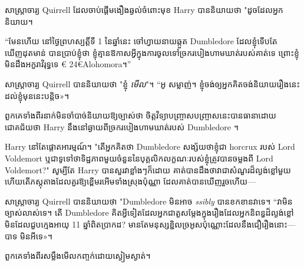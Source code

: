 សាស្ត្រាចារ្យ Quirrell ដែលចាប់ផ្តើមងឿងឆ្ងល់ចំពោះមុខ Harry បាននិយាយថា "ដូចដែលអ្នកនិយាយ។

“មែនហើយ នៅថ្ងៃព្រហស្បត្តិ៍ទី 1 នៃឆ្នាំនេះ ចៅហ្វាយនាយឆ្កួត Dumbledore ដែលខ្ញុំទើបតែឃើញដុតមាន់ បានប្រាប់ខ្ញុំថា ខ្ញុំគ្មានឱកាសអ្វីក្នុងការចូលទៅច្រករបៀងហាមឃាត់របស់គាត់ទេ ព្រោះខ្ញុំមិនដឹងអក្ខរាវិរុទ្ធទេ € 24€{Alohomora។}”

សាស្រ្តាចារ្យ Quirrell បាននិយាយថា "ខ្ញុំ \emph{មើល}"។ “អូ សម្លាញ់។ ខ្ញុំ​ចង់​ឲ្យ​អ្នក​គិត​ចង់​និយាយ​រឿង​នេះ​ដល់​ខ្ញុំ​មុន​នេះ​បន្តិច»។

ពួកគេទាំងពីរនាក់មិនចាំបាច់និយាយឱ្យច្បាស់ថា ចិត្តវិទ្យាបញ្ច្រាសបញ្ច្រាសនេះបានធានាដោយជោគជ័យថា Harry នឹងនៅឆ្ងាយពីច្រករបៀងហាមឃាត់របស់ Dumbledore ។

Harry នៅតែផ្តោតអារម្មណ៍។ "តើអ្នកគិតថា Dumbledore សង្ស័យថាខ្ញុំជា horcrux របស់ Lord Voldemort ឬជាទូទៅថាទិដ្ឋភាពមួយចំនួននៃបុគ្គលិកលក្ខណៈរបស់ខ្ញុំត្រូវបានចម្លងពី Lord Voldemort?" សូម្បីតែ Harry បានសួរវាខ្លាំងៗក៏ដោយ គាត់បានដឹងថាវាជាសំណួរដ៏ល្ងង់ខ្លៅមួយ ហើយតើភស្តុតាងដែលគួរឱ្យខ្ពើមរអើមទាំងស្រុងប៉ុណ្ណា ដែលគាត់បានឃើញរួចហើយ—

សាស្ត្រាចារ្យ Quirrell បាននិយាយថា "Dumbledore មិនអាច \emph{ssibly} បានខកខានវាទេ។ “វា​មិន​ច្បាស់​លាស់​ទេ។ តើ Dumbledore គិតអ្វីទៀតដែលអ្នកជាតួសម្តែងក្នុងរឿងដែលអ្នកនិពន្ធដ៏ល្ងង់ខ្លៅមិនដែលជួបក្មេងអាយុ 11 ឆ្នាំពិតប្រាកដ? មាន​តែ​មនុស្ស​ខ្ជិល​ច្រអូស​ប៉ុណ្ណោះ​ដែល​នឹង​ជឿ​រឿង​នោះ—បាទ មិន​អី​ទេ»។

ពួកគេទាំងពីរសម្លឹងមើលកញ្ចក់ដោយស្ងៀមស្ងាត់។

